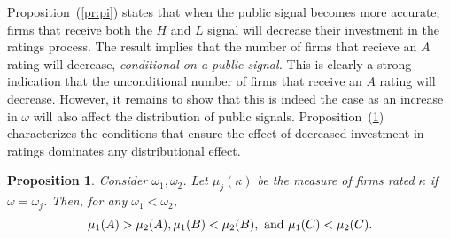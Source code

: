 \documentclass[notitlepage]{article}
\newtheorem{proposition}{Proposition}
\begin{document}

Proposition~(\ref{pr:pi}) states that when the public signal becomes more accurate, firms that receive both the $H$ and $L$ signal will decrease their investment in the ratings process.  The result implies that the number of firms that recieve an $A$ rating will decrease, \emph{conditional on a public signal.} This is clearly a strong indication that the unconditional number of firms that receive an $A$ rating will decrease. However, it remains to show that this is indeed the case as an increase in $\omega$ will also affect the distribution of public signals. Proposition~(\ref{pr:dist}) characterizes the conditions that ensure the effect of decreased investment in ratings dominates any distributional effect.

\begin{proposition}
\label{pr:dist}
Consider $\omega_{1},\omega_{2}$. Let $\mu_{j}(\kappa)$ be the measure of firms rated $\kappa$ if $\omega=\omega_{j}$. Then, for any $\omega_{1}<\omega_{2}$,
\begin{equation*}
\mu_{1}(A)>\mu_{2}(A), \mu_{1}(B)<\mu_{2}(B), \textup{ and } \mu_{1}(C)<\mu_{2}(C).
\end{equation*}
\end{proposition}
\end{document}
